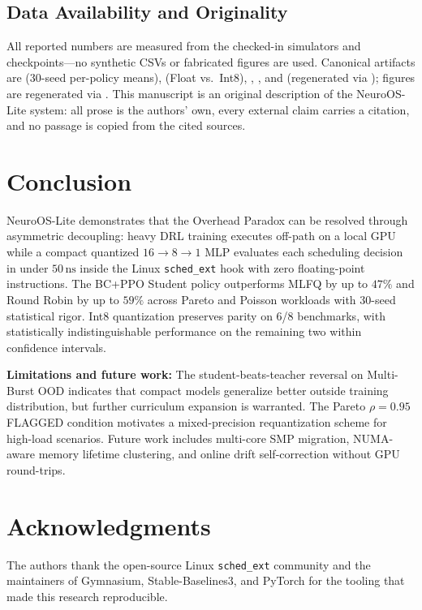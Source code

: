 \subsection{Data Availability and Originality}
\label{subsec:data}

\begin{sloppypar}
All reported numbers are measured from the checked-in simulators and
checkpoints---no synthetic CSVs or fabricated figures are used. Canonical
artifacts are  (30-seed
per-policy means), 
(Float vs.\ Int8), ,
, and
 (regenerated via
); figures are regenerated via
. This manuscript is an
original description of the NeuroOS-Lite system: all prose is the authors'
own, every external claim carries a citation, and no passage is copied from
the cited sources.
\end{sloppypar}

\section{Conclusion}
\label{sec:conclusion}

NeuroOS-Lite demonstrates that the Overhead Paradox can be resolved through
asymmetric decoupling: heavy DRL training executes off-path on a local GPU
while a compact quantized $16\to 8\to 1$ MLP evaluates each scheduling
decision in under $50\,\text{ns}$ inside the Linux \texttt{sched\_ext}
hook with zero floating-point instructions. The BC+PPO Student policy
outperforms MLFQ by up to $47\%$ and Round Robin by up to $59\%$ across
Pareto and Poisson workloads with 30-seed statistical rigor. Int8
quantization preserves parity on 6/8 benchmarks, with statistically
indistinguishable performance on the remaining two within confidence intervals.

\textbf{Limitations and future work:}
The student-beats-teacher reversal on Multi-Burst OOD indicates that compact
models generalize better outside training distribution, but further curriculum
expansion is warranted. The Pareto $\rho = 0.95$ FLAGGED condition motivates
a mixed-precision requantization scheme for high-load scenarios. Future work
includes multi-core SMP migration, NUMA-aware memory lifetime clustering, and
online drift self-correction without GPU round-trips.

\section*{Acknowledgments}
The authors thank the open-source Linux \texttt{sched\_ext} community and the
maintainers of Gymnasium, Stable-Baselines3, and PyTorch for the tooling that
made this research reproducible.





